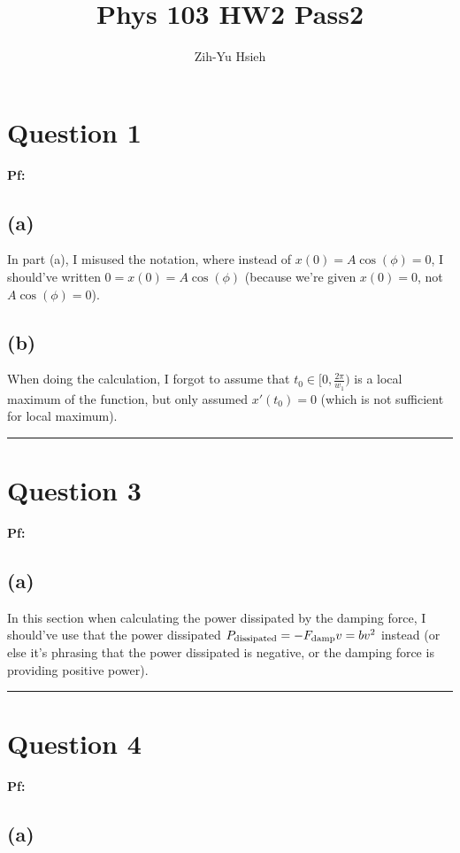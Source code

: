\documentclass{article}
\title{Phys 103 HW2 Pass2}
\author{Zih-Yu Hsieh}
\begin{document}
\maketitle

\section*{Question 1}

\textbf{Pf:}
\subsection*{(a)}
In part (a), I misused the notation, where instead of $x(0)=A\cos(\phi)=0$, I should've written $0=x(0)=A\cos(\phi)$ (because we're given $x(0)=0$, not $A\cos(\phi)=0$).

\subsection*{(b)}
When doing the calculation, I forgot to assume that $t_0\in [0,\frac{2\pi}{w_1})$ is a local maximum of the function, but only assumed $x'(t_0)=0$ (which is not sufficient for local maximum).

\hfil

\rule{15.6cm}{0.1mm}

\hfil

\section*{Question 3}

\textbf{Pf:}

\subsection*{(a)}
In this section when calculating the power dissipated by the damping force, I should've use that the power dissipated $P_\textmd{dissipated} = -F_\textmd{damp} v = bv^2$ instead (or else it's phrasing that the power dissipated is negative, or the damping force is providing positive power).

\hfil

\rule{15.6cm}{0.1mm}

\hfil

\section*{Question 4}

\textbf{Pf:}
\subsection*{(a)}
\end{document}
